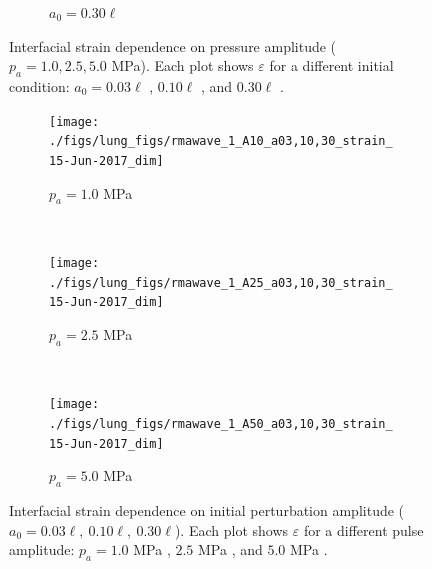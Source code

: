 \begin{figure}
\begin{subfigure}[b]{0.49\textwidth}
    \caption{\label{fig:strain_multi-pa_a30} $a_0 = 0.30\ell$}
  \end{subfigure}
  \caption[Interfacial strain dependence on pressure amplitude
  ($p_a=1.0, 2.5, 5.0$ MPa)]%
  {Interfacial strain dependence on pressure amplitude
    ($p_a=1.0, 2.5, 5.0$ MPa). Each plot shows $\varepsilon$ for a
    different initial condition: $a_0=0.03\ell$
    , $0.10\ell$
    , and $0.30\ell$
    .}
  \label{fig:pa_dependence_strain}
\end{figure}
% 
\begin{figure}
  \centering
  \begin{subfigure}[b]{0.49\textwidth}
    \texttt{[image: ./figs/lung\_figs/rmawave\_1\_A10\_a03,10,30\_strain\_15-Jun-2017\_dim]}
    \caption{\label{fig:strain_multi-a0-A10} $p_a = 1.0$ MPa}
  \end{subfigure}
  ~ 
  \begin{subfigure}[b]{0.49\textwidth}
    \texttt{[image: ./figs/lung\_figs/rmawave\_1\_A25\_a03,10,30\_strain\_15-Jun-2017\_dim]}
    \caption{\label{fig:strain_multi-a0-A25} $p_a = 2.5$ MPa}
  \end{subfigure}
  ~
  \begin{subfigure}[b]{0.49\textwidth}
    \texttt{[image: ./figs/lung\_figs/rmawave\_1\_A50\_a03,10,30\_strain\_15-Jun-2017\_dim]}
    \caption{\label{fig:strain_multi-a0-A50} $p_a = 5.0$ MPa}
  \end{subfigure}
  \caption[Interfacial strain dependence on initial perturbation
  amplitude ($a_0=0.03\ell,~0.10\ell,~0.30\ell$)]%
  {Interfacial strain dependence on initial perturbation amplitude
    ($a_0=0.03\ell,~0.10\ell,~0.30\ell$). Each plot shows $\varepsilon$
    for a different pulse amplitude: $p_a = 1.0 $ MPa
    , $2.5$ MPa
    , and $5.0$ MPa
    .}
  \label{fig:a0_dependence_strain}
\end{figure}
% 
% 
